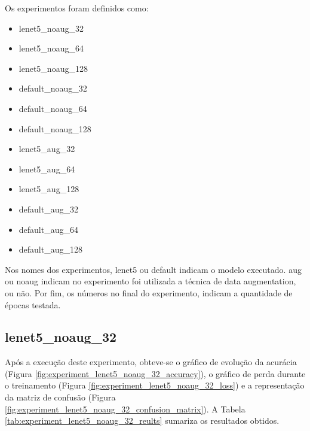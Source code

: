 \documentclass[12pt]{article}
\begin{document}
Os experimentos foram definidos como:

\begin{itemize}
  \item lenet5\_noaug\_32
  \item lenet5\_noaug\_64
  \item lenet5\_noaug\_128
  \item default\_noaug\_32
  \item default\_noaug\_64
  \item default\_noaug\_128
  \item lenet5\_aug\_32
  \item lenet5\_aug\_64
  \item lenet5\_aug\_128
  \item default\_aug\_32
  \item default\_aug\_64
  \item default\_aug\_128
\end{itemize}

Nos nomes dos experimentos, lenet5 ou default indicam o modelo executado. aug ou noaug indicam no experimento foi utilizada a técnica de data augmentation, ou não. Por fim, os números no final do experimento, indicam a quantidade de épocas testada.

\newpage

\subsection{lenet5\_noaug\_32}

Após a execução deste experimento, obteve-se o gráfico de evolução da acurácia (Figura \ref{fig:experiment_lenet5_noaug_32_accuracy}), o gráfico de perda durante o treinamento (Figura \ref{fig:experiment_lenet5_noaug_32_loss}) e a representação da matriz de confusão (Figura \ref{fig:experiment_lenet5_noaug_32_confusion_matrix}). A Tabela \ref{tab:experiment_lenet5_noaug_32_reults} sumariza os resultados obtidos.
\end{document}
